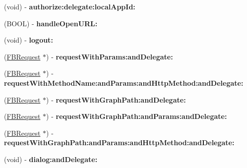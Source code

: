 \begin{DoxyCompactItemize}
\item 
\hypertarget{interface_facebook_a6f8b7a7d0999024180dcdee71dba1dfe}{
(void) -\/ {\bfseries authorize\-:delegate\-:local\-App\-Id\-:}}
\label{interface_facebook_a6f8b7a7d0999024180dcdee71dba1dfe}

\item 
\hypertarget{interface_facebook_af59e46399f97cdb3f7f235822a30f06f}{
(\-B\-O\-O\-L) -\/ {\bfseries handle\-Open\-U\-R\-L\-:}}
\label{interface_facebook_af59e46399f97cdb3f7f235822a30f06f}

\item 
\hypertarget{interface_facebook_a204f10894608b3e10943e15d9861c9be}{
(void) -\/ {\bfseries logout\-:}}
\label{interface_facebook_a204f10894608b3e10943e15d9861c9be}

\item 
\hypertarget{interface_facebook_abda41d7c75de5231b460869564a4148c}{
(\hyperlink{interface_f_b_request}{\-F\-B\-Request} $\ast$) -\/ {\bfseries request\-With\-Params\-:and\-Delegate\-:}}
\label{interface_facebook_abda41d7c75de5231b460869564a4148c}

\item 
\hypertarget{interface_facebook_abdd8888ceec0cc9641b3939345cb71bb}{
(\hyperlink{interface_f_b_request}{\-F\-B\-Request} $\ast$) -\/ {\bfseries request\-With\-Method\-Name\-:and\-Params\-:and\-Http\-Method\-:and\-Delegate\-:}}
\label{interface_facebook_abdd8888ceec0cc9641b3939345cb71bb}

\item 
\hypertarget{interface_facebook_ade34a729c134bba23ad8a432346a52b3}{
(\hyperlink{interface_f_b_request}{\-F\-B\-Request} $\ast$) -\/ {\bfseries request\-With\-Graph\-Path\-:and\-Delegate\-:}}
\label{interface_facebook_ade34a729c134bba23ad8a432346a52b3}

\item 
\hypertarget{interface_facebook_a01d3d35b70775982c37d68a53b911438}{
(\hyperlink{interface_f_b_request}{\-F\-B\-Request} $\ast$) -\/ {\bfseries request\-With\-Graph\-Path\-:and\-Params\-:and\-Delegate\-:}}
\label{interface_facebook_a01d3d35b70775982c37d68a53b911438}

\item 
\hypertarget{interface_facebook_a735024bca08b871be8fb5a7660ed56b5}{
(\hyperlink{interface_f_b_request}{\-F\-B\-Request} $\ast$) -\/ {\bfseries request\-With\-Graph\-Path\-:and\-Params\-:and\-Http\-Method\-:and\-Delegate\-:}}
\label{interface_facebook_a735024bca08b871be8fb5a7660ed56b5}

\item 
\hypertarget{interface_facebook_afb28ba8c9088bea131e780cbf7a34839}{
(void) -\/ {\bfseries dialog\-:and\-Delegate\-:}}
\label{interface_facebook_afb28ba8c9088bea131e780cbf7a34839}


\end{DoxyCompactItemize}
